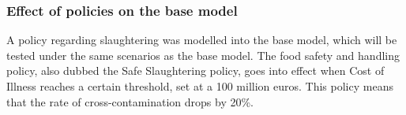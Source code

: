 \iffalse
\subsubsection{Effect of policies on the base model}
A policy regarding slaughtering was modelled into the base model, which will be tested under the same scenarios as the base model. The food safety and handling policy, also dubbed the Safe Slaughtering policy, goes into effect when Cost of Illness reaches a certain threshold, set at a 100 million euros. This policy means that the rate of cross-contamination drops by 20\%.  

